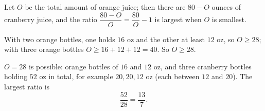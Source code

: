 Let $O$ be the total amount of orange juice; then there are $80-O$ ounces of cranberry juice, and the ratio $\dfrac{80-O}{O}=\dfrac{80}{O}-1$ is largest when $O$ is smallest.

With two orange bottles, one holds $16$ oz and the other at least $12$ oz, so $O\ge28$; with three orange bottles $O\ge16+12+12=40$. So $O\ge28$.

$O=28$ is possible: orange bottles of $16$ and $12$ oz, and three cranberry bottles holding $52$ oz in total, for example $20,20,12$ oz (each between $12$ and $20$). The largest ratio is
\[\dfrac{52}{28}=\boxed{\dfrac{13}{7}}.\]
